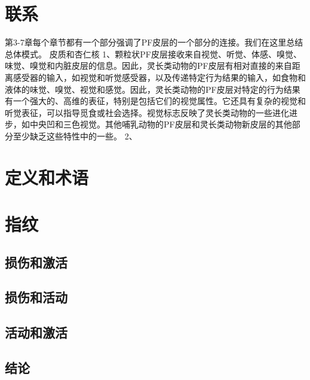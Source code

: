 \section{联系}
第3-7章每个章节都有一个部分强调了PF皮层的一个部分的连接。我们在这里总结总体模式。
皮质和杏仁核
1、颗粒状PF皮层接收来自视觉、听觉、体感、嗅觉、味觉、嗅觉和内脏皮层的信息。因此，灵长类动物的PF皮层有相对直接的来自距离感受器的输入，如视觉和听觉感受器，以及传递特定行为结果的输入，如食物和液体的味觉、嗅觉、视觉和感觉。因此，灵长类动物的PF皮层对特定的行为结果有一个强大的、高维的表征，特别是包括它们的视觉属性。它还具有复杂的视觉和听觉表征，可以指导觅食或社会选择。视觉标志反映了灵长类动物的一些进化进步，如中央凹和三色视觉。其他哺乳动物的PF皮层和灵长类动物新皮层的其他部分至少缺乏这些特性中的一些。
2、


\section{定义和术语}


\section{指纹}

\subsection{损伤和激活}

\subsection{损伤和活动}

\subsection{活动和激活}




\subsection{结论}


